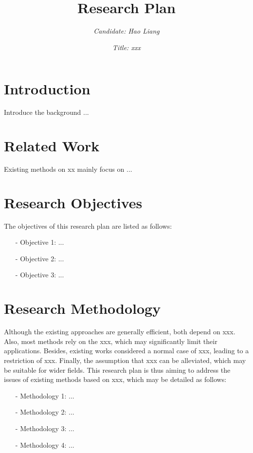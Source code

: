 \documentclass{article}
\title{\Huge \textbf{Research Plan}}
\author{\emph{Candidate: Hao Liang}}
\date{\emph{Title: xxx}}
\begin{document}
	
	\maketitle 
	
	
	\section{Introduction}%
	\large{
		
		Introduce the background \cite{liang2022adaptive, liang2022sparse}...
		
	
	}
	

	\section{Related Work} %
	
	\large{
	Existing methods on xx mainly focus on ...
	
	}


	\section{Research Objectives}
	
	\large{
		The objectives of this research plan are listed as follows:
		
		\begin{itemize}
			\item[-] Objective 1: ...
			
			\item[-] Objective 2: ...
			
			\item[-] Objective 3: ...
		\end{itemize}
		}
	
	\section{Research Methodology}
	
	\large{
		Although the existing approaches are generally efficient, both depend on xxx. Also, most methods rely on the xxx, which may significantly limit their applications. Besides, existing works considered a normal case of xxx, leading to a restriction of xxx. Finally, the assumption that xxx can be alleviated, which may be suitable for wider fields. This research plan is thus aiming to address the issues of existing methods based on xxx, which may be detailed as follows:
		
		\begin{itemize}
			\item[-] Methodology 1: ...
			
			
			\item[-] Methodology 2: ...
			
			
			\item[-] Methodology 3: ...
			
			
			\item[-] Methodology 4: ...
		\end{itemize}
	}
	
\end{document}
